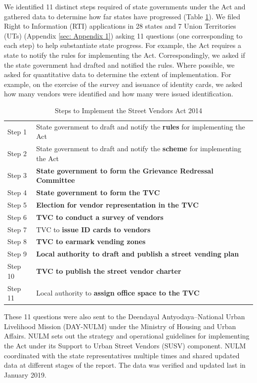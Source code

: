 \documentclass[a4paper, 12pt, twoside]{article}
\begin{document}
	We identified 11 distinct steps required of state governments under the Act and gathered data to determine how far states have progressed (Table \ref{tab: SVACsteps}). We filed Right to Information (RTI) applications in 28 states and 7 Union Territories (UTs) (Appendix \ref{sec: Appendix 1}) asking 11 questions (one corresponding to each step) to help substantiate state progress. For example, the Act requires a state to notify the rules for implementing the Act. Correspondingly, we asked if the state government had drafted and notified the rules. Where possible, we asked for quantitative data to determine the extent of implementation. For example, on the exercise of the survey and issuance of identity cards, we asked how many vendors were identified and how many were issued identification.
\begin{table}[htpb]
\caption{Steps to Implement the Street Vendors Act 2014}
\label{tab: SVACsteps}
\begin{tabular}{ l  l } %
\toprule
Step 1	&	State government to draft and notify the \textbf{rules} for implementing the Act\\
Step 2 	&	State government to draft and notify the \textbf{scheme} for implementing the Act\\
Step 3	&	\textbf{State government to form the Grievance Redressal Committee}\\
Step 4	&	\textbf{State government to form the TVC}\\
Step 5	&	\textbf{Election for vendor representation in the TVC}\\
Step 6	&	\textbf{TVC to conduct a survey of vendors}\\
Step 7	&	TVC to \textbf{issue ID cards to vendors}\\
Step 8	&	\textbf{TVC to earmark vending zones}\\
Step 9 	&	\textbf{Local authority to draft and publish a street vending plan}\\
Step 10	&	\textbf{TVC to publish the street vendor charter}\\
Step 11	&	Local authority to \textbf{assign office space to the TVC}\\
\bottomrule
\end{tabular}
\end{table}

These 11 questions were also sent to the Deendayal Antyodaya–National Urban Livelihood Mission (DAY-NULM) under the Ministry of Housing and Urban Affairs. NULM sets out the strategy and operational guidelines for implementing the Act under its Support to Urban Street Vendors (SUSV) component. NULM coordinated with the state representatives multiple times and shared updated data at different stages of the report. The data was verified and updated last in January 2019.
\end{document}
